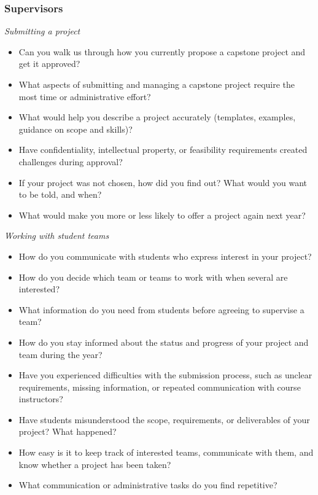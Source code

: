 \documentclass{article}
\begin{document}
    \subsubsection*{Supervisors}
    \textit{Submitting a project}
    \begin{itemize}
        \item Can you walk us through how you currently propose a capstone project and get it approved?
        \item What aspects of submitting and managing a capstone project require the most time or administrative effort?
        \item What would help you describe a project accurately (templates, examples, guidance on scope and skills)?
        \item Have confidentiality, intellectual property, or feasibility requirements created challenges during approval?
        \item If your project was not chosen, how did you find out? What would you want to be told, and when?
        \item What would make you more or less likely to offer a project again next year?
    \end{itemize}
    \textit{Working with student teams}
    \begin{itemize}
        \item How do you communicate with students who express interest in your project?
        \item How do you decide which team or teams to work with when several are interested?
        \item What information do you need from students before agreeing to supervise a team?
        \item How do you stay informed about the status and progress of your project and team during the year?
        \item Have you experienced difficulties with the submission process, such as unclear requirements, missing information, or repeated communication with course instructors?
        \item Have students misunderstood the scope, requirements, or deliverables of your project? What happened?
        \item How easy is it to keep track of interested teams, communicate with them, and know whether a project has been taken?
        \item What communication or administrative tasks do you find repetitive?
    \end{itemize}
\end{document}
